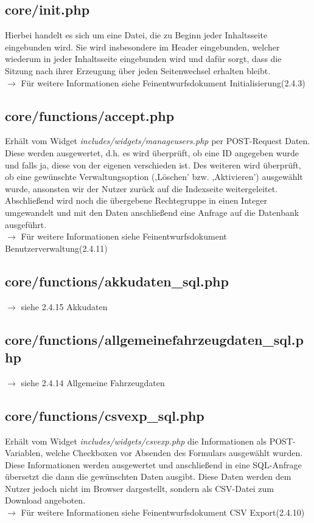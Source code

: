 \documentclass[fontsize = 12pt, paper = a4]{scrreprt}
\begin{document}
\subsection{core/init.php}
Hierbei handelt es sich um eine Datei, die zu Beginn jeder Inhaltsseite eingebunden wird. Sie wird insbesondere im Header eingebunden, welcher wiederum in jeder Inhaltsseite eingebunden wird und dafür sorgt, dass die Sitzung nach ihrer Erzeugung über jeden Seitenwechsel erhalten bleibt.\\
$\rightarrow$ Für weitere Informationen siehe Feinentwurfsdokument \glqq Initialisierung\grqq (2.4.3)

\subsection{core/functions/accept.php}
Erhält vom Widget \textit{includes/widgets/manageusers.php} per POST-Request Daten. Diese werden ausgewertet, d.h. es wird überprüft, ob eine ID angegeben wurde und falls ja, diese von der eigenen verschieden ist. Des weiteren wird überprüft, ob eine gewünschte Verwaltungsoption (,Löschen' bzw. ,Aktivieren') ausgewählt wurde, ansonsten wir der Nutzer zurück auf die Indexseite weitergeleitet. Abschließend wird noch die übergebene Rechtegruppe in einen Integer umgewandelt und mit den Daten anschließend eine Anfrage auf die Datenbank ausgeführt.\\
$\rightarrow$ Für weitere Informationen siehe Feinentwurfsdokument \glqq Benutzerverwaltung\grqq (2.4.11)

\subsection{core/functions/akkudaten\_sql.php}
$\rightarrow$ siehe 2.4.15 Akkudaten

\subsection{core/functions/allgemeinefahrzeugdaten\_sql.php}
$\rightarrow$ siehe 2.4.14 Allgemeine Fahrzeugdaten

\subsection{core/functions/csvexp\_sql.php}
Erhält vom Widget \textit{includes/widgets/csvexp.php} die Informationen als POST-Variablen, welche Checkboxen vor Absenden des Formulars ausgewählt wurden. Diese Informationen werden ausgewertet und anschließend in eine SQL-Anfrage übersetzt die dann die gewünschten Daten ausgibt. Diese Daten werden dem Nutzer jedoch nicht im Browser dargestellt, sondern als CSV-Datei zum Download angeboten.\\
$\rightarrow$ Für weitere Informationen siehe Feinentwurfsdokument \glqq CSV Export\grqq (2.4.10)
\end{document}
